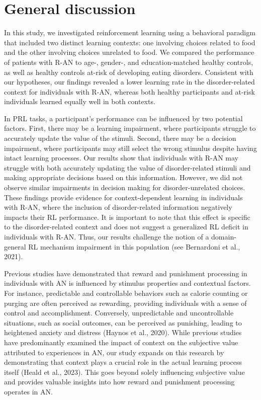 \documentclass[
  man,floatsintext]{apa6}
\begin{document}
\hypertarget{general-discussion}{%
\section{General discussion}\label{general-discussion}}

In this study, we investigated reinforcement learning using a behavioral paradigm that included two distinct learning contexts: one involving choices related to food and the other involving choices unrelated to food. We compared the performance of patients with R-AN to age-, gender-, and education-matched healthy controls, as well as healthy controls at-risk of developing eating disorders. Consistent with our hypotheses, our findings revealed a lower learning rate in the disorder-related context for individuals with R-AN, whereas both healthy participants and at-risk individuals learned equally well in both contexts.

In PRL tasks, a participant's performance can be influenced by two potential factors. First, there may be a learning impairment, where participants struggle to accurately update the value of the stimuli. Second, there may be a decision impairment, where participants may still select the wrong stimulus despite having intact learning processes. Our results show that individuals with R-AN may struggle with both accurately updating the value of disorder-related stimuli and making appropriate decisions based on this information. However, we did not observe similar impairments in decision making for disorder-unrelated choices. These findings provide evidence for context-dependent learning in individuals with R-AN, where the inclusion of disorder-related information negatively impacts their RL performance. It is important to note that this effect is specific to the disorder-related context and does not suggest a generalized RL deficit in individuals with R-AN. Thus, our results challenge the notion of a domain-general RL mechanism impairment in this population (see Bernardoni et al., 2021).

Previous studies have demonstrated that reward and punishment processing in individuals with AN is influenced by stimulus properties and contextual factors. For instance, predictable and controllable behaviors such as calorie counting or purging are often perceived as rewarding, providing individuals with a sense of control and accomplishment. Conversely, unpredictable and uncontrollable situations, such as social outcomes, can be perceived as punishing, leading to heightened anxiety and distress (Haynos et al., 2020). While previous studies have predominantly examined the impact of context on the subjective value attributed to experiences in AN, our study expands on this research by demonstrating that context plays a crucial role in the actual learning process itself (Heald et al., 2023). This goes beyond solely influencing subjective value and provides valuable insights into how reward and punishment processing operates in AN.
\end{document}

